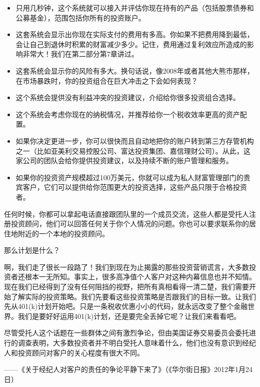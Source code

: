 \begin{itemize}
\item 只用几秒钟，这个系统就可以接入并评估你现在持有的产品（包括股票债券和公募基金），范围包括你所有的投资账户。
\item 这套系统会显示出你现在实际支付的费用有多高。你如果不把费用降到最低，会让自己到退休时积累的财富减少多少。记住，费用通过复利效应所造成的影响非常大！我们在第二部分第7章讲过。
\item 这套系统会显示你的风险有多大。换句话说，像2008年或者其他大熊市那样，在市场暴跌时，你的投资组合在巨大冲击之下会如何表现？
\item 这个系统会提供没有利益冲突的投资建议，介绍给你很多投资组合选择。
\item 这个系统会考虑你现在的纳税情况，并推荐给你一个税收效率更高的资产配置。
\item 如果你决定更进一步，你可以很快而且自动地把你的账户转到第三方存管机构之一（比如亚美利交易控股公司、富达投资集团、嘉信理财公司）。从此，这家公司的团队会给你提供投资建议，以及持续不断的账户管理和服务。
\item 如果你的投资资产规模超过100万美元，你就可以成为私人财富管理部门的贵宾客户，它们可以提供给你范围更大的投资选择，这些产品只限于合格投资者。
\end{itemize}

任何时候，你都可以拿起电话直接跟团队里的一个成员交流，这些人都是受托人注册投资顾问，他们可以回答任何关于你个人情况的问题。你也可以要求联系你的居住地附近的一个本地的投资顾问。

那么计划是什么？

啊，我们走了很长一段路了！我们到现在为止揭露的那些投资营销谎言，大多数投资者还根本一无所知。事实上，很多高净值个人客户对这种内幕信息也并不知情。现在我们已经得到了没有任何阻挡的视野，把所有真相看得一清二楚，我们需要开始了解实际的投资策略。我们先要看这些投资策略是否跟我们的目标一致。让我们先从401(k)计划开始吧。只是一条税收优惠小小的代码，就永远改变了整个金融世界。我们是要好好运用401(k)计划，还是要完全丢掉它呢？让我们来看看吧。

\begin{BookQuote}
尽管受托人这个话题在一些群体之间有激烈争论，但由美国证券交易委员会委托进行的调查表明，大多数投资者并不明白受托人意味着什么，他们也没有意识到经纪人和投资顾问对客户的关心程度有很大不同。

\hfill ——《关于经纪人对客户的责任的争论平静下来了》（《华尔街日报》2012年1月24日）
\end{BookQuote}


